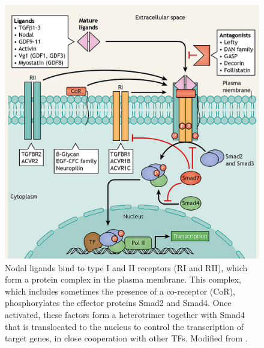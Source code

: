 \begin{figure}[ht!]
\centering
\includegraphics[width=1\textwidth]{Figures/Intro/Intro_Nodal.png}
\caption[Nodal pathway]{Nodal ligands bind to type I and II receptors (RI and RII), which form a protein complex in the plasma membrane. This complex, which includes sometimes the presence of a co-receptor (CoR), phosphorylates the effector proteins Smad2 and Smad4. Once activated, these factors form a heterotrimer together with Smad4 that is translocated to the nucleus to control the transcription of target genes, in close cooperation with other TFs. Modified from \parencite{jia_tgf_2021}. }
\label{fig:Intro_Nodal}
\end{figure} 


